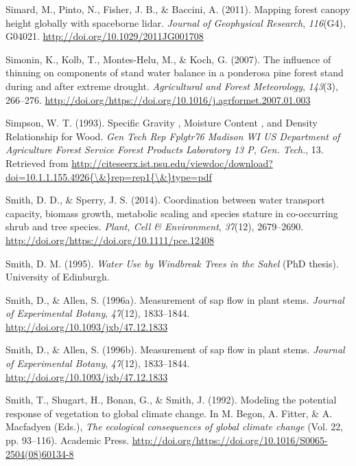 \documentclass[11pt,twoside]{reedthesis}
\begin{document}
\hypertarget{ref-simard_mapping_2011}{}
Simard, M., Pinto, N., Fisher, J. B., \& Baccini, A. (2011). Mapping
forest canopy height globally with spaceborne lidar. \emph{Journal of
Geophysical Research}, \emph{116}(G4), G04021.
\url{http://doi.org/10.1029/2011JG001708}

\hypertarget{ref-simonin2007}{}
Simonin, K., Kolb, T., Montes-Helu, M., \& Koch, G. (2007). The
influence of thinning on components of stand water balance in a
ponderosa pine forest stand during and after extreme drought.
\emph{Agricultural and Forest Meteorology}, \emph{143}(3), 266--276.
\url{http://doi.org/https://doi.org/10.1016/j.agrformet.2007.01.003}

\hypertarget{ref-Simpson1993}{}
Simpson, W. T. (1993). Specific Gravity , Moisture Content , and Density
Relationship for Wood. \emph{Gen Tech Rep Fplgtr76 Madison WI US
Department of Agriculture Forest Service Forest Products Laboratory 13
P}, \emph{Gen. Tech.}, 13. Retrieved from
\href{http://citeseerx.ist.psu.edu/viewdoc/download?doi=10.1.1.155.4926\%7B/\&\%7Drep=rep1\%7B/\&\%7Dtype=pdf}{http://citeseerx.ist.psu.edu/viewdoc/download?doi=10.1.1.155.4926\{\textbackslash{}\&\}rep=rep1\{\textbackslash{}\&\}type=pdf}

\hypertarget{ref-Smith2014}{}
Smith, D. D., \& Sperry, J. S. (2014). Coordination between water
transport capacity, biomass growth, metabolic scaling and species
stature in co-occurring shrub and tree species. \emph{Plant, Cell \&
Environment}, \emph{37}(12), 2679--2690.
\url{http://doi.org/https://doi.org/10.1111/pce.12408}

\hypertarget{ref-Smith1995}{}
Smith, D. M. (1995). \emph{Water Use by Windbreak Trees in the Sahel}
(PhD thesis). University of Edinburgh.

\hypertarget{ref-Smith1996}{}
Smith, D., \& Allen, S. (1996a). Measurement of sap flow in plant stems.
\emph{Journal of Experimental Botany}, \emph{47}(12), 1833--1844.
\url{http://doi.org/10.1093/jxb/47.12.1833}

\hypertarget{ref-Smith1996a}{}
Smith, D., \& Allen, S. (1996b). Measurement of sap flow in plant stems.
\emph{Journal of Experimental Botany}, \emph{47}(12), 1833--1844.
\url{http://doi.org/10.1093/jxb/47.12.1833}

\hypertarget{ref-Smith1992}{}
Smith, T., Shugart, H., Bonan, G., \& Smith, J. (1992). Modeling the
potential response of vegetation to global climate change. In M. Begon,
A. Fitter, \& A. Macfadyen (Eds.), \emph{The ecological consequences of
global climate change} (Vol. 22, pp. 93--116). Academic Press.
\url{http://doi.org/https://doi.org/10.1016/S0065-2504(08)60134-8}
\end{document}
